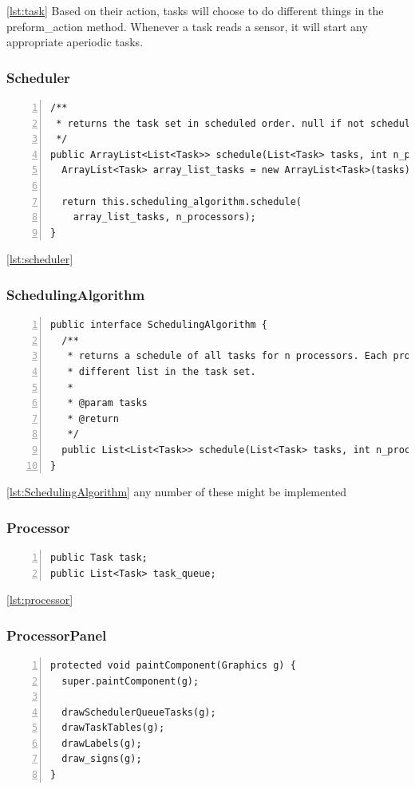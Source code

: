 \documentclass{article} %
\begin{document}
\ref{lst:task}
Based on their action, tasks will choose to do different things in the preform\_action method.
Whenever a task reads a sensor, it will start any appropriate aperiodic tasks.

\subsubsection{Scheduler}
\begin{lstlisting}[caption={The scheduler uses a scheduling algorithm to choose the order of tasks},label={lst:scheduler},numbers=left]
/**
 * returns the task set in scheduled order. null if not schedulable.
 */
public ArrayList<List<Task>> schedule(List<Task> tasks, int n_processors) {
  ArrayList<Task> array_list_tasks = new ArrayList<Task>(tasks);

  return this.scheduling_algorithm.schedule(
    array_list_tasks, n_processors);
}
\end{lstlisting}

\ref{lst:scheduler}

\subsubsection{SchedulingAlgorithm}
\begin{lstlisting}[caption={Scheduling Algorithm interface},label={lst:SchedulingAlgorithm},numbers=left]
public interface SchedulingAlgorithm {
  /**
   * returns a schedule of all tasks for n processors. Each processor has a
   * different list in the task set.
   * 
   * @param tasks
   * @return
   */
  public List<List<Task>> schedule(List<Task> tasks, int n_processors);
}
\end{lstlisting}

\ref{lst:SchedulingAlgorithm}
any number of these might be implemented

\subsubsection{Processor}
\begin{lstlisting}[caption={},label={lst:processor},numbers=left]
public Task task;
public List<Task> task_queue;
\end{lstlisting}

\ref{lst:processor}

\subsubsection{ProcessorPanel}
\begin{lstlisting}[caption={},label={lst:ProcessorPanel},numbers=left]
protected void paintComponent(Graphics g) {
  super.paintComponent(g);

  drawSchedulerQueueTasks(g);
  drawTaskTables(g);
  drawLabels(g);
  draw_signs(g);
}
\end{lstlisting}
\end{document}
